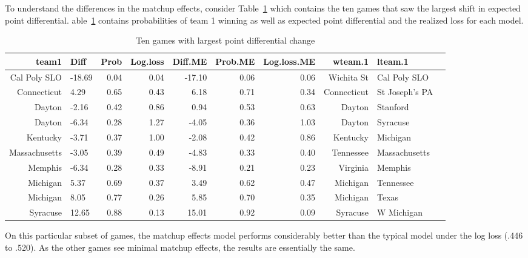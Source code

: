 To understand the differences in the matchup effects, consider Table~\ref{tab:change} which contains the ten games that saw the largest shift in expected point differential.  able~\ref{tab:change} contains probabilities of team 1 winning as well as expected point differential and the realized loss for each model.
\begin{table}[ht]
\caption{Ten games with largest point differential change}
\footnotesize
\centering
\begin{tabular}{rlrrrrrrll}
  \hline
 team1 & Diff & Prob & Log.loss & Diff.ME & Prob.ME & Log.loss.ME & wteam.1 & lteam.1 \\ 
  \hline
 Cal Poly SLO & -18.69 & 0.04 & 0.04 & -17.10 & 0.06 & 0.06 & Wichita St & Cal Poly SLO \\ 
 Connecticut & 4.29 & 0.65 & 0.43 & 6.18 & 0.71 & 0.34 & Connecticut & St Joseph's PA \\ 
 Dayton & -2.16 & 0.42 & 0.86 & 0.94 & 0.53 & 0.63 & Dayton & Stanford \\ 
 Dayton & -6.34 & 0.28 & 1.27 & -4.05 & 0.36 & 1.03 & Dayton & Syracuse \\ 
 Kentucky & -3.71 & 0.37 & 1.00 & -2.08 & 0.42 & 0.86 & Kentucky & Michigan \\ 
 Massachusetts & -3.05 & 0.39 & 0.49 & -4.83 & 0.33 & 0.40 & Tennessee & Massachusetts \\ 
 Memphis & -6.34 & 0.28 & 0.33 & -8.91 & 0.21 & 0.23 & Virginia & Memphis \\ 
 Michigan & 5.37 & 0.69 & 0.37 & 3.49 & 0.62 & 0.47 & Michigan & Tennessee \\ 
 Michigan & 8.05 & 0.77 & 0.26 & 5.85 & 0.70 & 0.35 & Michigan & Texas \\ 
 Syracuse & 12.65 & 0.88 & 0.13 & 15.01 & 0.92 & 0.09 & Syracuse & W Michigan \\ 
   \hline
\end{tabular}
\label{tab:change}
\end{table}
On this particular subset of games, the matchup effects model performs considerably better than the typical model under the log loss (.446 to .520).  As the other games see minimal matchup effects, the results are essentially the same.  